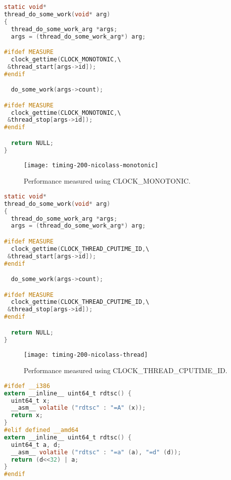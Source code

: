 \begin{lstlisting}[caption={Code using CLOCK\_MONOTONIC to monitor time.},label={lst:monotonic},language=C]
static void*
thread_do_some_work(void* arg)
{
  thread_do_some_work_arg *args;
  args = (thread_do_some_work_arg*) arg;

#ifdef MEASURE
  clock_gettime(CLOCK_MONOTONIC,\
 &thread_start[args->id]);
#endif

  do_some_work(args->count);

#ifdef MEASURE
  clock_gettime(CLOCK_MONOTONIC,\
 &thread_stop[args->id]);
#endif

  return NULL;
}
\end{lstlisting}

\begin{figure}
\centering
\texttt{[image: timing-200-nicolass-monotonic]}
\caption{Performance measured using CLOCK\_MONOTONIC.}
\label{fig:monotonic}
\end{figure}

\begin{lstlisting}[caption={Code using CLOCK\_THREAD\_CPUTIME\_ID to monitor time.},label={lst:thread},language=C]
static void*
thread_do_some_work(void* arg)
{
  thread_do_some_work_arg *args;
  args = (thread_do_some_work_arg*) arg;

#ifdef MEASURE
  clock_gettime(CLOCK_THREAD_CPUTIME_ID,\
 &thread_start[args->id]);
#endif

  do_some_work(args->count);

#ifdef MEASURE
  clock_gettime(CLOCK_THREAD_CPUTIME_ID,\
 &thread_stop[args->id]);
#endif

  return NULL;
}
\end{lstlisting}

\begin{figure}
\centering
\texttt{[image: timing-200-nicolass-thread]}
\caption{Performance measured using CLOCK\_THREAD\_CPUTIME\_ID.}
\label{fig:thread}
\end{figure}

\begin{lstlisting}[caption={C inline assembly implementation of rdtsc using hardware registers.},label={lst:rdtsc},language=C]
#ifdef __i386
extern __inline__ uint64_t rdtsc() {
  uint64_t x;
  __asm__ volatile ("rdtsc" : "=A" (x));
  return x;
}
#elif defined __amd64
extern __inline__ uint64_t rdtsc() {
  uint64_t a, d;
  __asm__ volatile ("rdtsc" : "=a" (a), "=d" (d));
  return (d<<32) | a;
}
#endif
\end{lstlisting}

